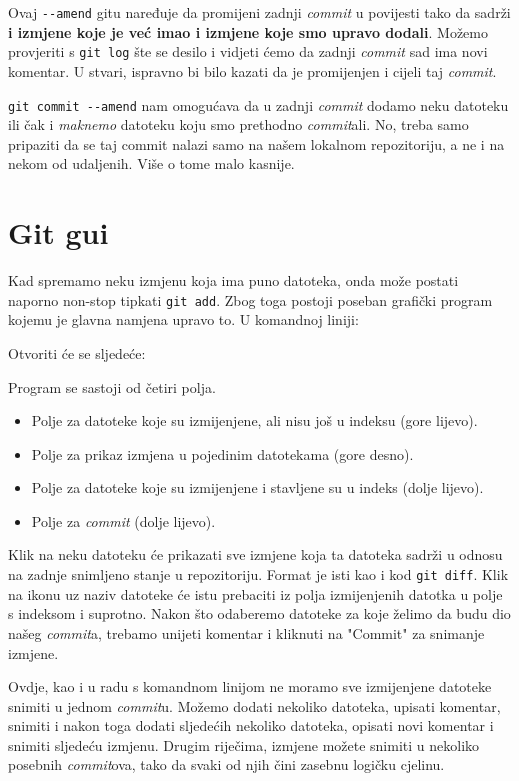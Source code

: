 Ovaj \verb+--amend+ gitu naređuje da promijeni zadnji \emph{commit} u povijesti tako da sadrži \textbf{i izmjene koje je već imao i izmjene koje smo upravo dodali}.
Možemo provjeriti s \verb+git log+ šte se desilo i vidjeti ćemo da zadnji \emph{commit} sad ima novi komentar.
U stvari, ispravno bi bilo kazati da je promijenjen i cijeli taj \emph{commit}.

\verb+git commit --amend+ nam omogućava da u zadnji \emph{commit} dodamo neku datoteku ili čak i \emph{maknemo} datoteku koju smo prethodno \emph{commit}ali. 
No, treba samo pripaziti da se taj commit nalazi samo na našem lokalnom repozitoriju, a ne i na nekom od udaljenih. 
Više o tome malo kasnije.

\section*{Git gui}

Kad spremamo neku izmjenu koja ima puno datoteka, onda može postati naporno non-stop tipkati \verb+git add+.
Zbog toga postoji poseban grafički program kojemu je glavna namjena upravo to.
U komandnoj liniji:


Otvoriti će se sljedeće:


Program se sastoji od četiri polja. 

\begin{itemize}
	\item Polje za datoteke koje su izmijenjene, ali nisu još u indeksu (gore lijevo).
	\item Polje za prikaz izmjena u pojedinim datotekama (gore desno). 
	\item Polje za datoteke koje su izmijenjene i stavljene su u indeks (dolje lijevo).
	\item Polje za \emph{commit} (dolje lijevo).
\end{itemize}

Klik na neku datoteku će prikazati sve izmjene koja ta datoteka sadrži u odnosu na zadnje snimljeno stanje u repozitoriju.
Format je isti kao i kod \verb+git diff+.
Klik na ikonu uz naziv datoteke će istu prebaciti iz polja izmijenjenih datotka u polje s indeksom i suprotno.
Nakon što odaberemo datoteke za koje želimo da budu dio našeg \emph{commit}a, trebamo unijeti komentar i kliknuti na "Commit" za snimanje izmjene.

Ovdje, kao i u radu s komandnom linijom ne moramo sve izmijenjene datoteke snimiti u jednom \emph{commit}u. 
Možemo dodati nekoliko datoteka, upisati komentar, snimiti i nakon toga dodati sljedećih nekoliko datoteka, opisati novi komentar i snimiti sljedeću izmjenu.
Drugim riječima, izmjene možete snimiti u nekoliko posebnih \emph{commit}ova, tako da svaki od njih čini zasebnu logičku cjelinu.

